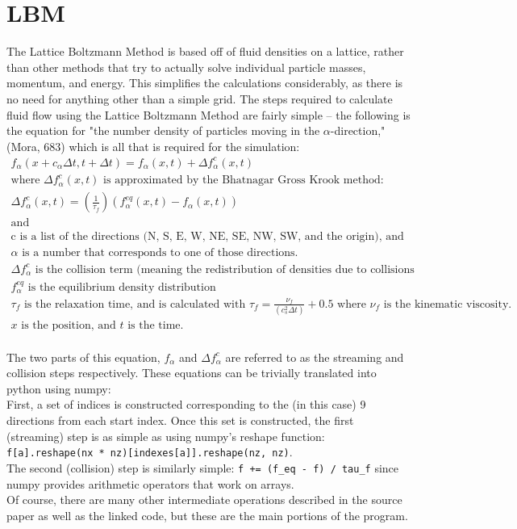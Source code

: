 \documentclass[12pt]{article}
\begin{document}
	\section{LBM}
	The Lattice Boltzmann Method is based off of fluid densities on a lattice, rather than other methods that try to actually solve individual particle masses, momentum, and energy. This simplifies the calculations considerably, as there is no need for anything other than a simple grid.
	The steps required to calculate fluid flow using the Lattice Boltzmann Method are fairly simple -- the following is the equation for "the number density of particles moving in the $\alpha$-direction," (Mora, 683) which is all that is required for the simulation:
	\begin{gather*}f_\alpha(x+c_\alpha\Delta t,t+\Delta t)=f_\alpha(x,t)+\Delta f_\alpha^c(x,t)\\\text{where }\Delta f_\alpha^c(x,t)\text{ is approximated by the Bhatnagar Gross Krook method:}\\\Delta f_\alpha^c(x,t)=\left(\frac{1}{\tau_f}\right)(f_\alpha^{eq}(x,t)-f_\alpha(x,t))\\\text{and}\\\text{c is a list of the directions (N, S, E, W, NE, SE, NW, SW, and the origin), and } \\\alpha\text{ is a number that corresponds to one of those directions.}\\\Delta f_\alpha^c\text{ is the collision term (meaning the redistribution of densities due to collisions [Mora 684]).}\\f_\alpha^{eq}\text{ is the equilibrium density distribution}\\\tau_f\text{ is the relaxation time, and is calculated with }\tau_f=\frac{\nu_f}{(c_s^2\Delta t)}+0.5\text{ where }\nu_f\text{ is the kinematic viscosity.}\\x\text{ is the position, and }t\text{ is the time.}\end{gather*}\\The two parts of this equation, $f_\alpha$ and $\Delta f_\alpha^c$ are referred to as the streaming and collision steps respectively.
	These equations can be trivially translated into python using numpy: \\
	First, a set of indices is constructed corresponding to the (in this case) 9 directions from each start index. Once this set is constructed, the first (streaming) step is as simple as using numpy's reshape function: 
	\texttt{f[a].reshape(nx * nz)[indexes[a]].reshape(nz, nz)}. \\
	The second (collision) step is similarly simple: \texttt{f += (f\_eq - f) / tau\_f} since numpy provides arithmetic operators that work on arrays.\\Of course, there are many other intermediate operations described in the source paper as well as the linked code, but these are the main portions of the program.
\end{document}
